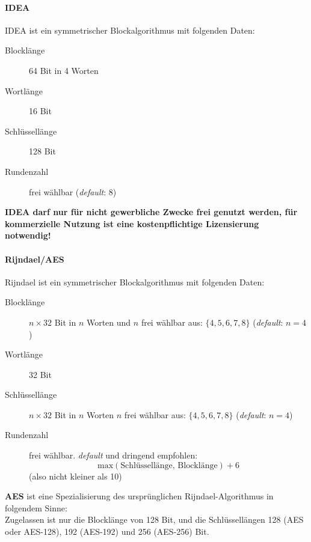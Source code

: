 \paragraph{IDEA}

IDEA ist ein symmetrischer Blockalgorithmus mit folgenden Daten:

\begin{description}

\item[Blockl\"ange] 64 Bit in 4 Worten

\item[Wortl\"ange] 16 Bit

\item[Schl\"ussell\"ange] 128 Bit

\item[Rundenzahl] frei w\"ahlbar (\textit{default}: 8)

\end{description}
\textbf{IDEA darf nur f\"ur nicht gewerbliche Zwecke frei genutzt
werden, f\"ur kommerzielle Nutzung ist eine kostenpflichtige
Lizensierung notwendig!}

\paragraph{Rijndael/AES}

Rijndael ist ein symmetrischer Blockalgorithmus mit folgenden Daten:

\begin{description}

\item[Blockl\"ange] $n\times32$ Bit in $n$ Worten und $n$ frei w\"ahlbar aus:
$\{4, 5, 6, 7, 8\}$ (\textit{default}: $n = 4$)

\item[Wortl\"ange] 32 Bit

\item[Schl\"ussell\"ange] $n\times32$ Bit in $n$ Worten $n$ frei w\"ahlbar 
aus: $\{4, 5, 6, 7, 8\}$ (\textit{default}: $n = 4$)

\item[Rundenzahl] frei w\"ahlbar. \textit{default} und dringend empfohlen:
$$\mbox{max}(\mbox{Schl\"ussell\"ange, Blockl\"ange}) + 6$$ (also nicht 
kleiner als 10)
\end{description}

\textbf{AES} ist eine Spezialisierung des urspr\"unglichen 
Rijndael-Algorithmus in folgendem Sinne: \\
Zugelassen ist nur die Blockl\"ange von 128 Bit, und die 
Schl\"ussell\"angen 128 (AES oder AES-128), 192 (AES-192) und 
256 (AES-256) Bit.


